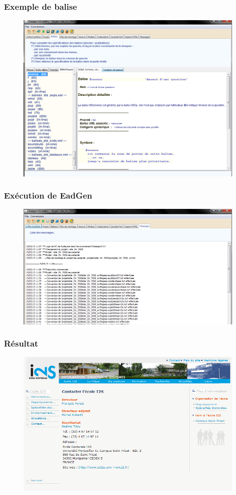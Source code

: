 \begin{frame}
	\frametitle{Exemple de balise}
	\begin{figure}
		\centering
		\includegraphics[scale=0.33]{resources/balise.PNG}
	\end{figure}
	\end{frame}
\begin{frame}
	\frametitle{Exécution de EadGen}
	\begin{figure}
		\centering
		\includegraphics[scale=0.39]{resources/messages.PNG}
	\end{figure}
	\end{frame}
\begin{frame}
	\frametitle{Résultat}
	\begin{figure}
		\centering
		\includegraphics[scale=0.47]{resources/pageHttp.PNG}
	\end{figure}
	\end{frame}
